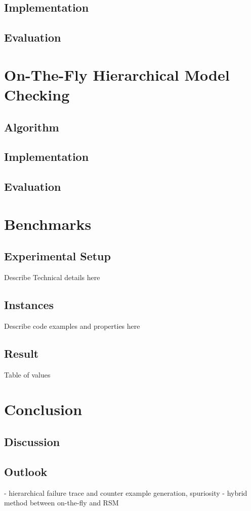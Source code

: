 \documentclass[a4paper, 12pt, twoside]{report}
\begin{document}
	\section{Implementation}
	\section{Evaluation}
	
	
	\chapter{On-The-Fly Hierarchical Model Checking}\label{chp:otf}
	\section{Algorithm}
	\section{Implementation}
	\section{Evaluation}
	
	\chapter{Benchmarks}	
	\section{Experimental Setup}
	Describe Technical details here
	\section{Instances}
	Describe code examples and properties here
	\section{Result}
	Table of values
	
	\chapter{Conclusion}
	\section{Discussion}	
	\section{Outlook}
	
		- hierarchical failure trace and counter example generation, spuriosity
	- hybrid method between on-the-fly and RSM
	
	
	{}
	
\end{document}
